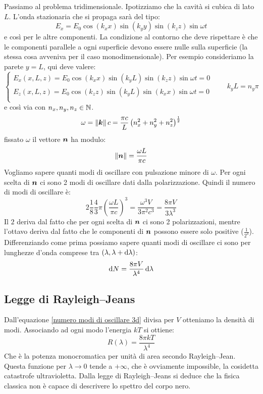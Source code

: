 Passiamo al problema tridimensionale. Ipotizziamo che la cavità si cubica di lato $L$. L'onda stazionaria che si propaga sarà del tipo:
\begin{equation}
	E_x=E_0\cos(k_x x)\sin(k_y y)\sin(k_z z)\sin\omega t
\end{equation}
e così per le altre componenti. La condizione al contorno che deve rispettare è che le componenti parallele a ogni superficie devono essere nulle sulla superficie (la stessa cosa avveniva per il caso monodimensionale). Per esempio consideriamo la parete $y=L$, qui deve valere:
\begin{equation}
	\left\{
	\begin{array}{l}
		E_x(x,L,z)=E_0\cos(k_x x)\sin(k_y L)\sin(k_z z)\sin\omega t=0 \\
		E_z(x,L,z)=E_0\cos(k_z z)\sin(k_y L)\sin(k_x x)\sin\omega t=0 \\
	\end{array}
	\right.\qquad
	k_y L=n_y\pi
\end{equation}
e così via con $n_x,n_y,n_z\in\mathbb{N}$.
\begin{equation}
	\omega=\left\lVert\boldsymbol{k}\right\rVert c=\frac{\pi c}{L}\left(n_x^2+n_y^2+n_z^2\right)^{\frac{1}{2}}
\end{equation}
fissato $\omega$ il vettore $\boldsymbol{n}$ ha modulo:
\begin{equation}
	\left\lVert\boldsymbol{n}\right\rVert=\frac{\omega L}{\pi c}
	\label{contorno3Dstaz}
\end{equation}
Vogliamo sapere quanti modi di oscillare con pulsazione minore di $\omega$. Per ogni scelta di $\boldsymbol{n}$ ci sono 2 modi di oscillare dati dalla polarizzazione. Quindi il numero di modi di oscillare è:
\begin{equation}
	2\frac{1}{8}\frac{4}{3}\pi\left(\frac{\omega L}{\pi c}\right)^3=\frac{\omega^3 V}{3\pi^2 c^3}=\frac{8\pi V}{3\lambda^3}
\end{equation}
Il $2$ deriva dal fatto che per ogni scelta di $\boldsymbol{n}$ ci sono 2 polarizzazioni, mentre l'ottavo deriva dal fatto che le componenti di $\boldsymbol{n}$ possono essere solo positive ($\frac{1}{2^3}$). Differenziando come prima possiamo sapere quanti modi di oscillare ci sono per lunghezze d'onda comprese tra $(\lambda,\lambda+\mathrm{d}\lambda)$:
\begin{equation}
	\mathrm{d} N=\frac{8\pi V}{\lambda^4}\,\mathrm{d}\lambda
	\label{numero modi di oscillare 3d}
\end{equation}

\subsection{Legge di Rayleigh--Jeans}
Dall'equazione \eqref{numero modi di oscillare 3d} divisa per $V$ otteniamo la densità di modi. Associando ad ogni modo l'energia $kT$ si ottiene:
\begin{equation}
	R(\lambda)=\frac{8\pi kT}{\lambda^4}
\end{equation}
Che è la potenza monocromatica per unità di area secondo Rayleigh--Jean. Questa funzione per $\lambda\to 0$ tende a $+\infty$, che è ovviamente impossible, la cosidetta catastrofe ultravioletta. Dalla legge di Rayleigh--Jeans si deduce che la fisica classica non è capace di descrivere lo spettro del corpo nero.
